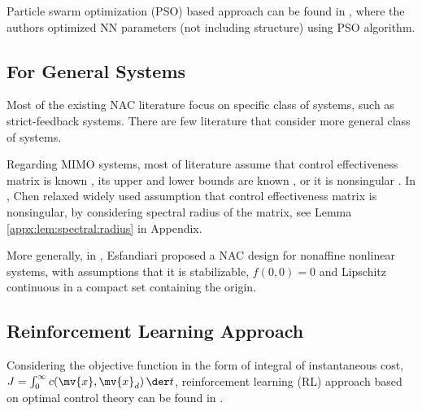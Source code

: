 \hfill

Particle swarm optimization (PSO) based approach can be found in \cite{Zhao:2016aa}, where the authors optimized NN parameters (not including structure) using PSO algorithm.

\subsection{For General Systems}

Most of the existing NAC literature focus on specific class of systems, such as strict-feedback systems.
There are few literature that consider more general class of systems.

\hfill

Regarding MIMO systems, most of literature assume that control effectiveness matrix is known \cite{Yu:2022aa}, its upper and lower bounds are known \cite{}, or it is nonsingular \cite{}.
In \cite{Chen:2011aa}, Chen \etal relaxed widely used assumption that control effectiveness matrix is nonsingular, by considering spectral radius of the matrix, see Lemma \ref{appx:lem:spectral:radius} in Appendix.

More generally, in \cite{Esfandiari:2017aa}, Esfandiari \etal proposed a NAC design for nonaffine nonlinear systems, with assumptions that it is stabilizable, $f(0,0)=0$ and Lipschitz continuous in a compact set containing the origin.

\subsection{Reinforcement Learning Approach}

Considering the objective function in the form of integral of instantaneous cost, \ie $J = \int_0^\infty c(\mv{x},\mv{x}_d)\,\der t$, reinforcement learning (RL) approach based on optimal control theory can be found in \cite{Esfandiari:2017aa}.